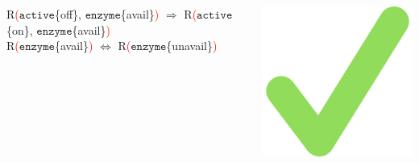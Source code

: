 \documentclass[10pt]{beamer}
\begin{document}
{\begin{center}
\begin{columns}
\begin{column}{0.1\textwidth}
\end{column}
\end{columns}

\vspace{.5cm}
\noindent\makebox[\linewidth]{\rule{1.1\textwidth}{0.4pt}}
\vspace{.2cm}

\begin{columns}
\begin{column}{0.9\textwidth}

{\small R\textcolor{red}{(}$\mathtt{active}$\{\textcolor{mygreen}{off}\}, $\mathtt{enzyme}$\{\textcolor{mygreen}{avail}\}\textcolor{red}{)} $\Rightarrow$ R\textcolor{red}{(}$\mathtt{active}$\{\textcolor{mygreen}{on}\}, $\mathtt{enzyme}$\{\textcolor{mygreen}{avail}\}\textcolor{red}{)} }\\

{\small R\textcolor{red}{(}$\mathtt{enzyme}$\{\textcolor{mygreen}{avail}\}\textcolor{red}{)}
$\Leftrightarrow$ R\textcolor{red}{(}$\mathtt{enzyme}$\{\textcolor{mygreen}{unavail}\}\textcolor{red}{)} }\\

\end{column}

\begin{column}{0.1\textwidth}
 
\includegraphics[width=.5\textwidth]{check-mark}

\end{column}
\end{columns}
\end{center}

}

\end{document}

